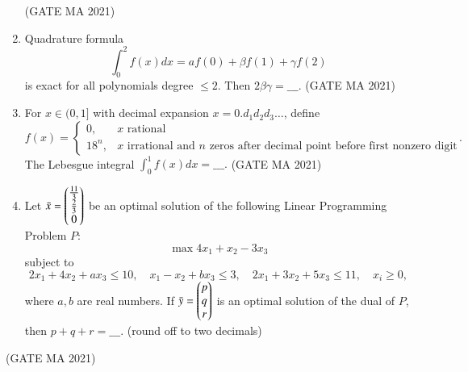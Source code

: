 \documentclass[journal,12pt,onecolumn]{IEEEtran}
\theoremstyle{remark}
\begin{document}
\begin{enumerate}
\hfill(GATE MA 2021)
    \item Quadrature formula
    $$
    \int_0^2 f(x) dx = a f(0) + \beta f(1) + \gamma f(2)
    $$
    is exact for all polynomials degree $\leq 2$. Then $2 \beta \gamma = \_\_\_$.
\hfill(GATE MA 2021)
    \item For $x \in (0,1]$ with decimal expansion $x = 0.d_1 d_2 d_3 \dots$, define
    $$
    f(x) = \begin{cases} 0, & x \text{ rational} \\ 18^n, & x \text{ irrational and $n$ zeros after decimal point before first nonzero digit}\end{cases}.
    $$
    The Lebesgue integral $\int_0^1 f(x) dx = \_\_\_.$
\hfill(GATE MA 2021)
    \item Let $\Bar{x}=\begin{pmatrix}\frac{11}{3}\\\frac{2}{3}\\0\end{pmatrix}$ be an optimal solution of the following Linear Programming\\
    Problem $P:$
    $$
    \max 4 x_1 + x_2 - 3 x_3
    $$
    subject to
    $$
    2 x_1 + 4 x_2 + a x_3 \leq 10, \quad x_1 - x_2 + b x_3 \leq 3, \quad 2 x_1 + 3 x_2 + 5 x_3 \leq 11, \quad x_i \geq 0,
    $$
    where $a,b$ are real numbers. If $\bar{y} = \begin{pmatrix}p\\q\\r\end{pmatrix}$ is an optimal solution of the dual of $P$, then $p + q + r = \_\_\_.$ (round off to two decimals)
\end{enumerate}
\hfill(GATE MA 2021)
\end{document}
